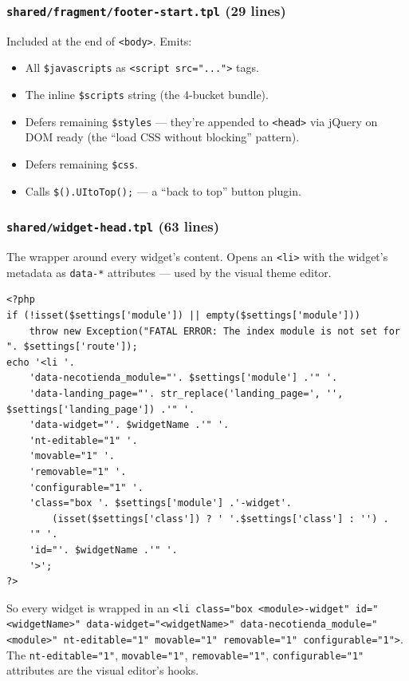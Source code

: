 \documentclass[11pt,a4paper]{article}
\begin{document}
\subsubsection{\texttt{shared/fragment/footer-start.tpl} (29 lines)}

Included at the end of \texttt{<body>}. Emits:

\begin{itemize}[leftmargin=1.6em,itemsep=2pt]
  \item All \texttt{\$javascripts} as \texttt{<script src="...">} tags.
  \item The inline \texttt{\$scripts} string (the 4-bucket bundle).
  \item Defers remaining \texttt{\$styles} --- they're appended to
        \texttt{<head>} via jQuery on DOM ready (the ``load CSS
        without blocking'' pattern).
  \item Defers remaining \texttt{\$css}.
  \item Calls \texttt{\$().UItoTop();} --- a ``back to top''
        button plugin.
\end{itemize}

\subsubsection{\texttt{shared/widget-head.tpl} (63 lines)}

The wrapper around every widget's content. Opens an \texttt{<li>}
with the widget's metadata as \texttt{data-*} attributes --- used
by the visual theme editor.

\begin{lstlisting}[caption={\texttt{shared/widget-head.tpl} --- the widget wrapper (abridged).},label={lst:widget-head}]
<?php
if (!isset($settings['module']) || empty($settings['module']))
    throw new Exception("FATAL ERROR: The index module is not set for ". $settings['route']);
echo '<li '.
    'data-necotienda_module="'. $settings['module'] .'" '.
    'data-landing_page="'. str_replace('landing_page=', '', $settings['landing_page']) .'" '.
    'data-widget="'. $widgetName .'" '.
    'nt-editable="1" '.
    'movable="1" '.
    'removable="1" '.
    'configurable="1" '.
    'class="box '. $settings['module'] .'-widget'.
        (isset($settings['class']) ? ' '.$settings['class'] : '') .
    '" '.
    'id="'. $widgetName .'" '.
    '>';
?>
\end{lstlisting}

So every widget is wrapped in an \texttt{<li class="box
<module>-widget" id="<widgetName>" data-widget="<widgetName>"
data-necotienda\_module="<module>" nt-editable="1" movable="1"
removable="1" configurable="1">}. The \texttt{nt-editable="1"},
\texttt{movable="1"}, \texttt{removable="1"},
\texttt{configurable="1"} attributes are the visual editor's hooks.
\end{document}
